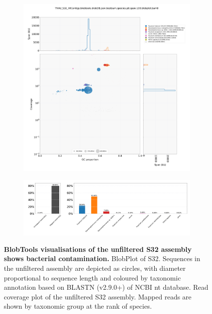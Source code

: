 \newpage
\begin{figure}[hp!]
    \centering
    \begin{subfigure}[]{0.9\textwidth}
        \centering
        \includegraphics[width=\textwidth]{Figures/TNAU_S32_AllContigs.blobtools.blobDB.json.bestsum.species.p8.span.100.blobplot.bam0.png}
        \caption{}
        \label{fig:BlobPlot-S32-All}
    \end{subfigure}
    \begin{subfigure}[]{0.9\textwidth}
        \centering
        \includegraphics[width=\textwidth]{Figures/TNAU_S32_AllContigs.blobtools.blobDB.json.bestsum.species.p8.span.100.blobplot.read_cov.bam0.png}
        \caption{}
        \label{fig:BlobPlot_readcov-S32-All}
    \end{subfigure}
    \caption[BlobTools visualisations of the unfiltered S32 assembly]{\textbf{BlobTools visualisations of the unfiltered S32 assembly shows bacterial contamination.}
         BlobPlot of S32. Sequences in the unfiltered assembly are depicted as circles, with diameter proportional to sequence length and coloured by taxonomic annotation based on BLASTN (v2.9.0+) of NCBI nt database.
         Read coverage plot of the unfiltered S32 assembly. Mapped reads are shown by taxonomic group at the rank of species.}
        \label{fig:S32:BlobToolsAllreads}
\end{figure}
\bigskip

